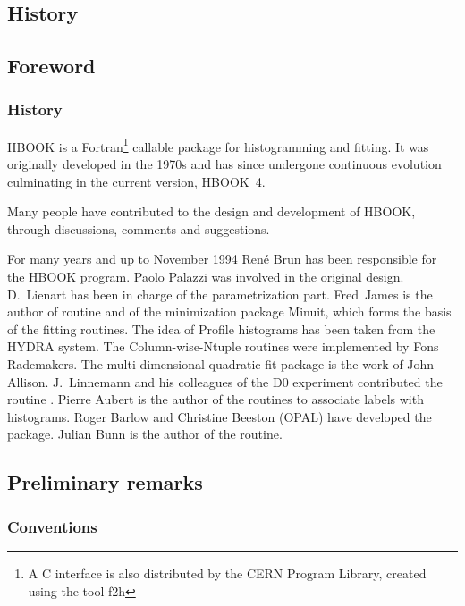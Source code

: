 \section*{History}
\begin{htmlonly}
\chapter{Foreword}
\subsection*{History}
\end{htmlonly}

HBOOK is a Fortran\footnote{A C interface is also distributed by
the CERN Program Library, created using the tool f2h} callable 
package for histogramming and fitting.
It was originally developed in the 1970s and has since
undergone continuous evolution culminating
in the current version, HBOOK~4.
 
Many people have contributed to the design and development of HBOOK,
through discussions, comments and suggestions.
 
For many years and up to November 1994 Ren\'e Brun 
has been responsible for the HBOOK program.
Paolo Palazzi was involved in the original design.
D.~Lienart has been in charge of the parametrization part. 
Fred~James is the author of routine  and of the minimization
package Minuit, which forms the basis of the fitting routines.
The idea of Profile histograms has been taken from the HYDRA system.
The Column-wise-Ntuple routines were implemented by Fons Rademakers.
The multi-dimensional quadratic fit package  is the work of
John Allison.
J.~Linnemann and his colleagues of the D0 experiment contributed
the routine .
Pierre Aubert is the author of the routines to associate labels
with histograms.
Roger Barlow and Christine Beeston (OPAL) have developed the 
 package.
Julian Bunn is the author of the  routine.


\section*{Preliminary remarks}
\begin{htmlonly}
\subsection*{Conventions}
\end{htmlonly}
 
